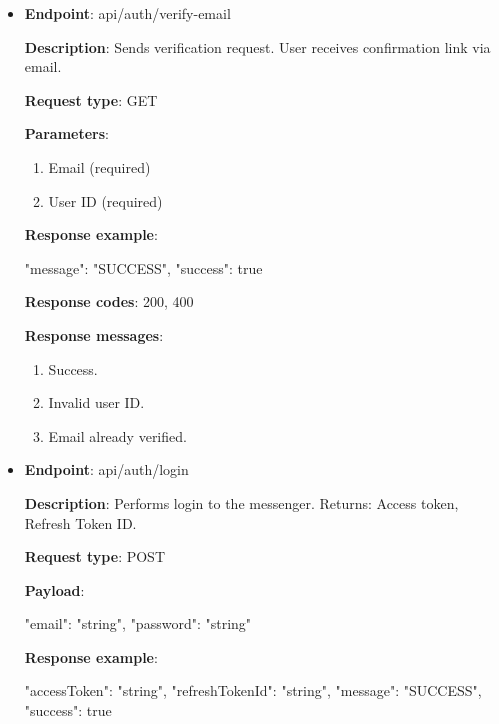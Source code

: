\begin{itemize}
    \pagebreak

    \item \textbf{Endpoint}: api/auth/verify-email

    \textbf{Description}: Sends verification request.
    User receives confirmation link via email.

    \textbf{Request type}: GET

    \textbf{Parameters}:

    \begin{enumerate}
        \item Email (required)
        \item User ID (required)
    \end{enumerate}

    \textbf{Response example}:

    \begin{spverbatim}
    {
        "message": "SUCCESS",
        "success": true
    }
    \end{spverbatim}

    \textbf{Response codes}: 200, 400

    \textbf{Response messages}:
    \begin{enumerate}
        \item Success.
        \item Invalid user ID.
        \item Email already verified.
    \end{enumerate}

    \vspace{5mm}

    \item \textbf{Endpoint}: api/auth/login

    \textbf{Description}: Performs login to the messenger.
    Returns: Access token, Refresh Token ID.

    \textbf{Request type}: POST

    \textbf{Payload}:

    \begin{spverbatim}
    {
        "email": "string",
        "password": "string"
    }
    \end{spverbatim}

    \textbf{Response example}:

    \begin{spverbatim}
    {
        "accessToken": "string",
        "refreshTokenId": "string",
        "message": "SUCCESS",
        "success": true
    }
    \end{spverbatim}


\end{itemize}
